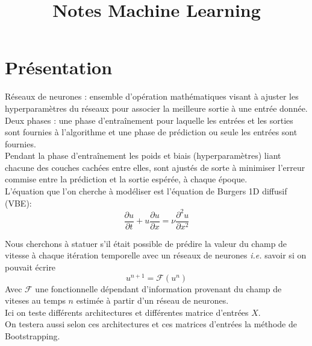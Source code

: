 \documentclass[a4paper,12pt]{report}
\title{\navy \textbf{Notes Machine Learning} \color{black}}%
\date{}
\newcommand{\bepar}[1]{
	\left( #1 \right)  
}
\numberwithin{equation}{section} %
\begin{document}
\maketitle
\chapter{Présentation}
Réseaux de neurones : ensemble d'opération mathématiques visant à ajuster les hyperparamètres du réseaux pour associer la meilleure sortie à une entrée donnée. \\
Deux phases : une phase d'entraînement pour laquelle les entrées et les sorties sont fournies à l'algorithme et une phase de prédiction ou seule les entrées sont fournies.\\
Pendant la phase d'entraînement les poids et biais (hyperparamètres) liant chacune des couches cachées entre elles, sont ajustés de sorte à minimiser l'erreur commise entre la prédiction et la sortie espérée, à chaque époque.\\

\noindent L'équation que l'on cherche à modéliser est l'équation de Burgers 1D diffusif (VBE):
\begin{equation*}
\frac{\partial u}{\partial t} + u \frac{\partial u}{\partial x} = \nu \frac{\partial^2 u}{\partial x^2} 
\end{equation*}

Nous cherchons à statuer s'il était possible de prédire la valeur du champ de vitesse à chaque itération temporelle avec un réseaux de neurones \textit{i.e.} savoir si on pouvait écrire 
\begin{equation*}
u^{n+1} = \mathcal{F}\bepar{u^n}	
\end{equation*}
Avec $\mathcal{F}$ une fonctionnelle dépendant d'information provenant du champ de viteses au temps $n$ estimée à partir d'un réseau de neurones.\\
Ici on teste différents architectures et différentes matrice d'entrées $X$.\\
On testera aussi selon ces architectures et ces matrices d'entrées la méthode de Bootstrapping.

\pagebreak
\end{document}
